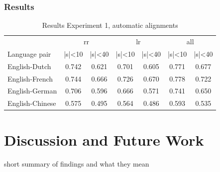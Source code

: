 \documentclass[a4paper, 11pt]{report}
\theoremstyle{definition}
\theoremstyle{plain}
\begin{document}
\subsection{Results}

\begin{table}[!h]
\centering
\begin{tabular}{l|cc|cc|cc}
& \multicolumn{2}{c}{rr} & \multicolumn{2}{c}{lr} & \multicolumn{2}{c}{all}\\
Language pair & |s|<10 & |s|<40 & |s|<10 & |s|<40 & |s|<10 & |s|<40\\
\hline
English-Dutch & 0.742 & 0.621 & 0.701 & 0.605 & 0.771 & 0.677\\
English-French & 0.744 & 0.666 & 0.726 & 0.670 & 0.778 & 0.722\\
English-German & 0.706 & 0.596 & 0.666 & 0.571 & 0.741 & 0.650\\
English-Chinese & 0.575 & 0.495 & 0.564 & 0.486 & 0.593 & 0.535\\
\end{tabular}
\caption{Results Experiment 1, automatic alignments}\label{tab:scores2}
\end{table}











%
%

\chapter{Discussion and Future Work}

short summary of findings and what they mean

\end{document}
